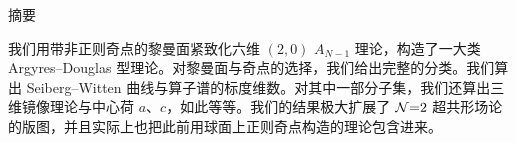 \begin{center}
{\heiti\large 摘\quad 要}
\end{center}

\noindent
我们用带非正则奇点的黎曼面紧致化六维 $(2,0)$ $A_{N-1}$ 理论，构造了一大类 Argyres--Douglas 型理论。对黎曼面与奇点的选择，我们给出完整的分类。我们算出 Seiberg--Witten 曲线与算子谱的标度维数。对其中一部分子集，我们还算出三维镜像理论与中心荷 $a$、$c$，如此等等。我们的结果极大扩展了 $\mathcal{N}{=}2$ 超共形场论的版图，并且实际上也把此前用球面上正则奇点构造的理论包含进来。

\vspace{0.6em}
